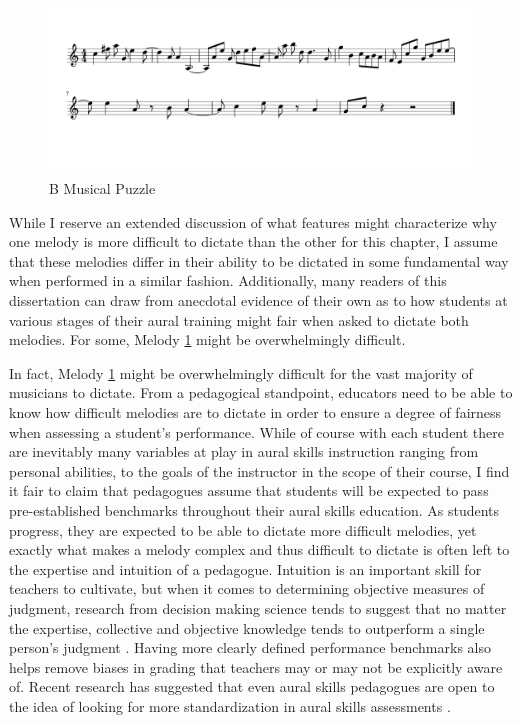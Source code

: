 \documentclass[12pt,]{book}
\begin{document}
\begin{figure}

{\centering \includegraphics[width=1\linewidth]{img/musicalpuzzle/MP2/MP_Y-1} 

}

\caption{B Musical Puzzle}\label{fig:musicalpuzzleB}
\end{figure}

While I reserve an extended discussion of what features might characterize why one melody is more difficult to dictate than the other for this chapter, I assume that these melodies differ in their ability to be dictated in some fundamental way when performed in a similar fashion.
Additionally, many readers of this dissertation can draw from anecdotal evidence of their own as to how students at various stages of their aural training might fair when asked to dictate both melodies.
For some, Melody \ref{fig:musicalpuzzleB} might be overwhelmingly difficult.

In fact, Melody \ref{fig:musicalpuzzleB} might be overwhelmingly difficult for the vast majority of musicians to dictate.
From a pedagogical standpoint, educators need to be able to know how difficult melodies are to dictate in order to ensure a degree of fairness when assessing a student's performance.
While of course with each student there are inevitably many variables at play in aural skills instruction ranging from personal abilities, to the goals of the instructor in the scope of their course, I find it fair to claim that pedagogues assume that students will be expected to pass pre-established benchmarks throughout their aural skills education.
As students progress, they are expected to be able to dictate more difficult melodies, yet exactly what makes a melody complex and thus difficult to dictate is often left to the expertise and intuition of a pedagogue.
Intuition is an important skill for teachers to cultivate, but when it comes to determining objective measures of judgment, research from decision making science tends to suggest that no matter the expertise, collective and objective knowledge tends to outperform a single person's judgment \citep{kahnemanThinkingFastSlow2012, loggAlgorithmAppreciationPeople2019, meehlClinicalStatisticalPrediction1954}.
Having more clearly defined performance benchmarks also helps remove biases in grading that teachers may or may not be explicitly aware of.
Recent research has suggested that even aural skills pedagogues are open to the idea of looking for more standardization in aural skills assessments \citep{paneyTeachingMelodicDictation2014}.
\end{document}
